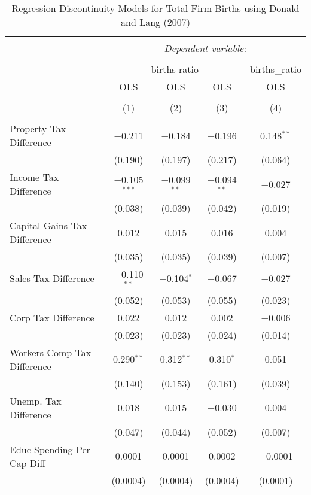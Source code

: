 
\begin{table}[!htbp] \centering 
  \caption{Regression Discontinuity Models for  Total Firm Births using Donald and Lang (2007)} 
  \label{} 
\begin{tabular}{@{\extracolsep{5pt}}lcccc} 
\\[-1.8ex]\hline 
\hline \\[-1.8ex] 
 & \multicolumn{4}{c}{\textit{Dependent variable:}} \\ 
\cline{2-5} 
\\[-1.8ex] & \multicolumn{3}{c}{births ratio} & births\_ratio \\ 
 & OLS & OLS & OLS & OLS \\ 
\\[-1.8ex] & (1) & (2) & (3) & (4)\\ 
\hline \\[-1.8ex] 
 Property Tax Difference & $-$0.211 & $-$0.184 & $-$0.196 & 0.148$^{**}$ \\ 
  & (0.190) & (0.197) & (0.217) & (0.064) \\ 
  Income Tax Difference & $-$0.105$^{***}$ & $-$0.099$^{**}$ & $-$0.094$^{**}$ & $-$0.027 \\ 
  & (0.038) & (0.039) & (0.042) & (0.019) \\ 
  Capital Gains Tax Difference & 0.012 & 0.015 & 0.016 & 0.004 \\ 
  & (0.035) & (0.035) & (0.039) & (0.007) \\ 
  Sales Tax Difference & $-$0.110$^{**}$ & $-$0.104$^{*}$ & $-$0.067 & $-$0.027 \\ 
  & (0.052) & (0.053) & (0.055) & (0.023) \\ 
  Corp Tax Difference & 0.022 & 0.012 & 0.002 & $-$0.006 \\ 
  & (0.023) & (0.023) & (0.024) & (0.014) \\ 
  Workers Comp Tax Difference & 0.290$^{**}$ & 0.312$^{**}$ & 0.310$^{*}$ & 0.051 \\ 
  & (0.140) & (0.153) & (0.161) & (0.039) \\ 
  Unemp. Tax Difference & 0.018 & 0.015 & $-$0.030 & 0.004 \\ 
  & (0.047) & (0.044) & (0.052) & (0.007) \\ 
  Educ Spending Per Cap Diff & 0.0001 & 0.0001 & 0.0002 & $-$0.0001 \\ 
  & (0.0004) & (0.0004) & (0.0004) & (0.0001) \\ 

\end{tabular}
\end{table}
